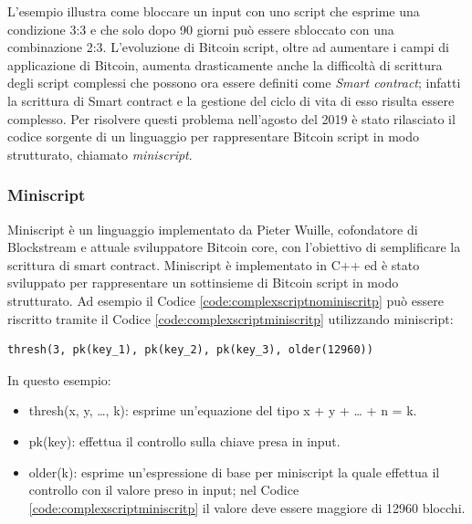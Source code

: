 

L’esempio illustra come bloccare un input con uno script che esprime una condizione 3:3 e che solo dopo 90 giorni può essere sbloccato con una combinazione 2:3.
L’evoluzione di Bitcoin script, oltre ad aumentare i campi di applicazione di Bitcoin, aumenta drasticamente anche la difficoltà di scrittura degli script complessi che possono ora essere definiti come {\it Smart contract\/}; infatti la scrittura di Smart contract e la gestione del ciclo di vita di esso risulta essere complesso.
Per risolvere questi problema nell'agosto del 2019 è stato rilasciato il codice sorgente di un linguaggio per rappresentare Bitcoin script in modo strutturato, chiamato \emph{miniscript}.

\subsubsection{Miniscript}

Miniscript è un linguaggio implementato da Pieter Wuille, cofondatore di Blockstream e attuale sviluppatore Bitcoin core, con l'obiettivo di semplificare la scrittura di smart contract.
Miniscript è implementato in C++ ed è stato sviluppato per rappresentare un sottinsieme di Bitcoin script in modo strutturato. Ad esempio il Codice \ref{code:complexscriptnominiscritp} può essere riscritto tramite il Codice \ref{code:complexscriptminiscritp} utilizzando miniscript:

\begin{lstlisting}[language=miniscript, label={code:complexscriptminiscritp}, caption={Un esempio di utilizzo di miniscript.}]
thresh(3, pk(key_1), pk(key_2), pk(key_3), older(12960))
\end{lstlisting}

In questo esempio:
\begin{itemize}
  \item thresh(x, y, …, k): esprime un'equazione del tipo x + y + … + n = k.
  \item pk(key): effettua il controllo sulla chiave presa in input.
  \item older(k): esprime un'espressione di base per miniscript la quale effettua il controllo con il valore preso in input; nel Codice \ref{code:complexscriptminiscritp} il valore deve essere maggiore di 12960 blocchi.
\end{itemize}

